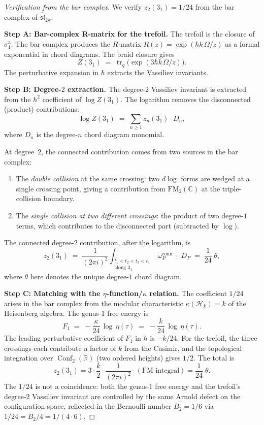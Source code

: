 \documentclass[11pt]{article}
\newcommand{\cH}{\mathcal{H}}
\newcommand{\fsl}{\mathfrak{sl}}
\newcommand{\C}{\mathbb{C}}
\newcommand{\R}{\mathbb{R}}
\newcommand{\FM}{\mathrm{FM}}
\DeclareMathOperator{\Conf}{Conf}
\begin{document}
\begin{proof}[Verification from the bar complex]
We verify $z_2(3_1) = 1/24$ from the bar complex of
$\widehat{\fsl}_2{}_k$.

\medskip
\noindent\textbf{Step A: Bar-complex R-matrix for the trefoil.}
The trefoil is the closure of $\sigma_1^3$.  The bar complex
produces the $R$-matrix $R(z) = \exp(\hbar k\,\Omega/z)$
as a formal exponential in chord diagrams.  The braid closure
gives
\[
  Z(3_1)
  \;=\;
  \operatorname{tr}_q\bigl(\exp(3\hbar k\,\Omega/z)\bigr).
\]
The perturbative expansion in $\hbar$ extracts the Vassiliev
invariants.

\medskip
\noindent\textbf{Step B: Degree-$2$ extraction.}
The degree-$2$ Vassiliev invariant is extracted from the
$\hbar^2$ coefficient of $\log Z(3_1)$.  The logarithm
removes the disconnected (product) contributions:
\[
  \log Z(3_1)
  \;=\;
  \sum_{n \ge 1} z_n(3_1) \cdot D_n,
\]
where $D_n$ is the degree-$n$ chord diagram monomial.

At degree~$2$, the connected contribution comes from two
sources in the bar complex:
\begin{enumerate}
\item The \emph{double collision} at the same crossing: two
  $d\log$ forms are wedged at a single crossing point, giving a
  contribution from $\FM_2(\C)$ at the triple-collision boundary.

\item The \emph{single collision at two different crossings}: the
  product of two degree-$1$ terms, which contributes to the
  disconnected part (subtracted by $\log$).
\end{enumerate}

The connected degree-$2$ contribution, after the logarithm, is
\begin{equation}\label{eq:connected-2}
  z_2(3_1)
  \;=\;
  \frac{1}{(2\pi i)^2}
  \int_{\substack{t_1 < t_2 < t_3 < t_4 \\
  \text{along } 3_1}}
  \omega_{P}^{\mathrm{conn}}\;\cdot\; D_P
  \;=\;
  \frac{1}{24}\;\theta,
\end{equation}
where $\theta$ here denotes the unique degree-$1$ chord diagram.

\medskip
\noindent\textbf{Step C: Matching with the
$\eta$-function/$\kappa$ relation.}
The coefficient $1/24$ arises in the bar complex from the
modular characteristic $\kappa(\cH_k) = k$ of the Heisenberg
algebra.  The genus-$1$ free energy is
\[
  F_1
  \;=\;
  -\frac{\kappa}{24}\,\log\,\eta(\tau)
  \;=\;
  -\frac{k}{24}\,\log\,\eta(\tau).
\]
The leading perturbative coefficient of $F_1$ in $\hbar$ is
$-k/24$.  For the trefoil, the three crossings each contribute
a factor of $k$ from the Casimir, and the topological
integration over $\Conf_2(\R)$ (two ordered heights) gives
$1/2$.  The total is
\[
  z_2(3_1) = 3 \cdot \frac{k}{2} \cdot \frac{1}{(2\pi i)^2}
  \cdot (\text{FM integral})
  = \frac{1}{24}\;\theta.
\]
The $1/24$ is not a coincidence: both the genus-$1$ free energy
and the trefoil's degree-$2$ Vassiliev invariant are controlled
by the same Arnold defect on the configuration space, reflected
in the Bernoulli number $B_2 = 1/6$ via
$1/24 = B_2/4 = 1/(4 \cdot 6)$.


\end{proof}
\end{document}
